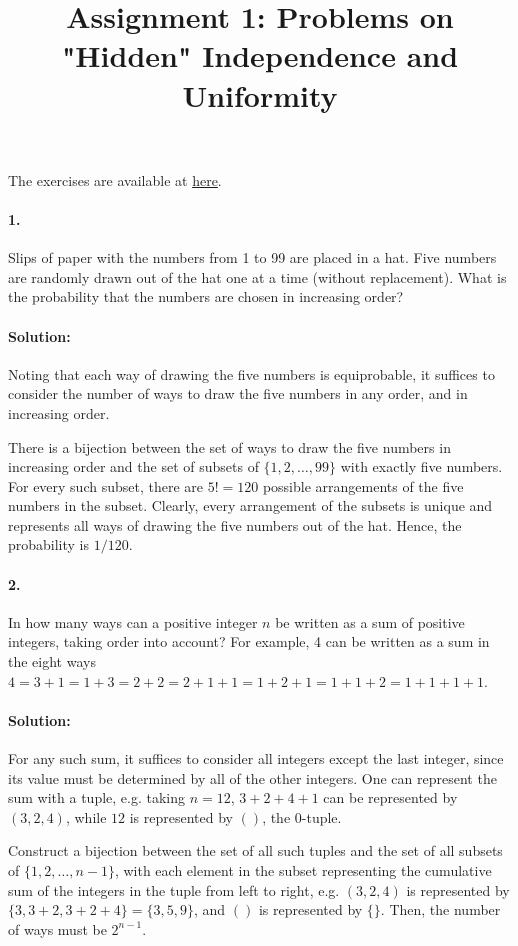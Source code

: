 \documentclass{article}
\begin{document}
\title{Assignment 1: Problems on "Hidden" Independence and Uniformity}
\maketitle

The exercises are available at \href{https://ocw.mit.edu/courses/mathematics/18-a34-mathematical-problem-solving-putnam-seminar-fall-2018/assignments/MIT18_A34F18PS1.pdf}{here}.

\paragraph{1.} Slips of paper with the numbers from 1 to 99 are placed in a
hat. Five numbers are randomly drawn out of the hat one at a time (without
replacement). What is the probability that the numbers are chosen in increasing
order?

\paragraph{Solution:} Noting that each way of drawing the five numbers is
equiprobable, it suffices to consider the number of ways to draw the five
numbers in any order, and in increasing order.

There is a bijection between the set of ways to draw the five numbers in
increasing order and the set of subsets of $\{1, 2, \ldots, 99\}$ with exactly
five numbers. For every such subset, there are $5! = 120$ possible arrangements
of the five numbers in the subset. Clearly, every arrangement of the subsets
is unique and represents all ways of drawing the five numbers out of the hat.
Hence, the probability is $1/120$.

\paragraph{2.} In how many ways can a positive integer $n$ be written as a sum
of positive integers, taking order into account? For example, 4 can be written
as a sum in the eight ways $4 = 3 + 1 = 1 + 3 = 2 + 2 = 2 + 1 + 1 = 1 + 2 + 1 =
1 + 1 + 2 = 1 + 1 + 1 + 1$.

\paragraph{Solution:} For any such sum, it suffices to consider all integers
except the last integer, since its value must be determined by all of the other
integers. One can represent the sum with a tuple, e.g. taking $n = 12$, $3 + 2
+ 4 + 1$ can be represented by $(3, 2, 4)$, while $12$ is represented by $()$,
the 0-tuple.

Construct a bijection between the set of all such tuples and the set of all
subsets of $\{1, 2, \ldots, n -  1\}$, with each element in the subset
representing the cumulative sum of the integers in the tuple from left to
right, e.g. $(3, 2, 4)$ is represented by $\{3, 3 + 2, 3 + 2 + 4\} = \{3, 5,
9\}$, and $()$ is represented by $\{\}$. Then, the number of ways must be
$2^{n - 1}$.
\end{document}
